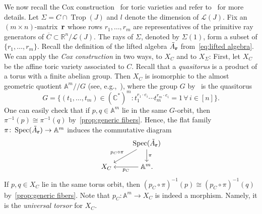 \documentclass[10pt,a4paper]{amsart}
\newcommand{\thref}[1]{\ref{#1}}
\numberwithin{equation}{section}
\DeclareMathOperator{\trop}{Trop}
\begin{document}
We now recall the Cox construction~\cite{Cox95} for toric varieties and refer to~\cite[Section~5]{CLS} for more details.
Let $\Sigma= C\cap \trop(J)$ and
$l$ denote the dimension of $\mathcal L(J)$.
Fix an $(m\times n)$-mat\-rix~${\bf r}$ whose rows $r_1,\dots,r_{m}$ are representatives of the primitive ray generators of $\overline{C}\subset \mathbb R^n/\mathcal L(J)$.
The rays of $\Sigma$, denoted by $\Sigma(1)$, form a subset of $\{{r}_1,\dots,{r}_{m}\}$.
Recall the definition of the lifted algebra $\tilde A_{\bf r}$ from~\eqref{eq:lifted algebra}.
We can apply the {\it Cox construction} in two ways, to $X_C$ and to $X_\Sigma$:
First, let $X_{C}$ be the affine toric variety associated to $C$.
Recall that a {\it quasitorus} is a product of a torus with a finite abelian group.
Then $X_{C}$ is isomorphic to the almost geometric quotient $\mathbb A^m/\!/G$ (see, e.g.,~\cite[Theorem~5.1.11]{CLS}), where the group $G$ by~\cite[Lemma~5.1.1(b)]{CLS} is the quasitorus
\begin{equation}\label{eq:quasitorus}
G=\{(t_1,\dots,t_m)\in(\mathbb C^*)^m\colon t_1^{r_1\cdot e_i}\cdots t_m^{r_m\cdot e_i}=1\, \forall \, i\in [n]\}.
\end{equation}
One can easily check that if $p,q\in \mathbb A^m$ lie in the same $G$-orbit, then $\pi^{-1}(p)\cong \pi^{-1}(q)$ by~\thref{prop:generic fibers}.
 Hence, the flat family $\pi\colon \operatorname{Spec}(\tilde A_{\bf r})\to \mathbb A^m$ induces the commutative diagram
 \begin{equation}\label{eq:Cox C}
 \begin{tikzcd}[ampersand replacement=\&,cramped]
 \& \operatorname{Spec}(\tilde A_{\bf r})\ar[d,"\pi"] \ar[dl,"p_{C}\circ \pi"'] \\
 X_{C} \& \mathbb A^m. \ar[l,"p_{C}"]
 \end{tikzcd}
 \end{equation}
 If $p,q\in X_{C}$ lie in the same torus orbit, then $(p_{C}\circ \pi)^{-1}(p)\cong (p_{C}\circ \pi)^{-1}(q)$ by~\thref{prop:generic fibers}.
 Note that $p_C\colon \mathbb A^m\to X_C$ is indeed a morphism. Namely, it is the {\it universal torsor} for $X_C$.
\end{document}
